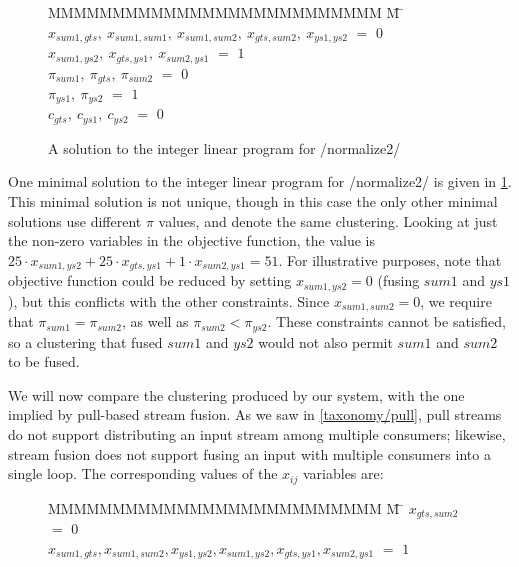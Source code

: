 \begin{figure}
\begin{tabbing}
MMMMMMMMMMMMMMMMMMMMMMMMMM \= M \= \kill
$x_{sum1, gts},~ x_{sum1, sum1},~ x_{sum1, sum2},~ x_{gts, sum2},~ x_{ys1,  ys2}$
    \> $=$ \> $0$ \\
$x_{sum1, ys2},~ x_{gts, ys1},~   x_{sum2, ys1}$
    \> $=$ \> $1$ 
\\[1ex]
$\pi_{sum1},~ \pi_{gts },~ \pi_{sum2}$
    \> $=$ \> $0$ \\
$\pi_{ys1 },~ \pi_{ys2 }$
    \> $=$ \> $1$ 
\\[1ex]
$c_{gts},~ c_{ys1},~ c_{ys2}$           
    \> $=$ \> $0$
\end{tabbing}
\caption{A solution to the integer linear program for \Hs/normalize2/}
\label{fig:clustering:normalize2-ilp-sol}
\end{figure}

One minimal solution to the integer linear program for \Hs/normalize2/ is given in \cref{fig:clustering:normalize2-ilp-sol}.
This minimal solution is not unique, though in this case the only other minimal solutions use different $\pi$ values, and denote the same clustering.
Looking at just the non-zero variables in the objective function, the value is $25 \cdot x_{sum1,ys2} + 25 \cdot x_{gts,ys1} + 1 \cdot x_{sum2, ys1} = 51$.
For illustrative purposes, note that objective function could be reduced by setting $x_{sum1,ys2} = 0$ (fusing $sum1$ and $ys1$), but this conflicts with the other constraints.
Since $x_{sum1, sum2} = 0$, we require that $\pi_{sum1} = \pi_{sum2}$, as well as \mbox{$\pi_{sum2} < \pi_{ys2}$}.
These constraints cannot be satisfied, so a clustering that fused $sum1$ and $ys2$ would not also permit $sum1$ and $sum2$ to be fused.

We will now compare the clustering produced by our system, with the one implied by pull-based stream fusion.
As we saw in \cref{taxonomy/pull}, pull streams do not support distributing an input stream among multiple consumers; likewise, stream fusion does not support fusing an input with multiple consumers into a single loop.
The corresponding values of the $x_{ij}$ variables are:

\begin{figure}[h!]
\begin{tabbing}
MMMMMMMMMMMMMMMMMMMMMMMMMM \= M \= \kill
$x_{gts, sum2}$
    \> $=$ \> $0$ \\
$x_{sum1, gts}, x_{sum1, sum2}, x_{ys1,  ys2}, x_{sum1, ys2}, x_{gts, ys1 }, x_{sum2, ys1}$
    \> $=$ \> $1$
\end{tabbing}
\end{figure}

